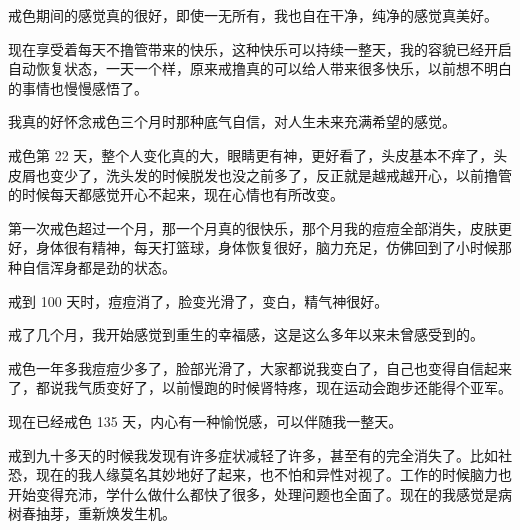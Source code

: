 \begin{case}
    戒色期间的感觉真的很好，即使一无所有，我也自在干净，纯净的感觉真美好。
\end{case}

\begin{case}
    现在享受着每天不撸管带来的快乐，这种快乐可以持续一整天，我的容貌已经开启自动恢复状态，一天一个样，原来戒撸真的可以给人带来很多快乐，以前想不明白的事情也慢慢感悟了。
\end{case}

\begin{case}
    我真的好怀念戒色三个月时那种底气自信，对人生未来充满希望的感觉。
\end{case}

\begin{case}
    戒色第 22 天，整个人变化真的大，眼睛更有神，更好看了，头皮基本不痒了，头皮屑也变少了，洗头发的时候脱发也没之前多了，反正就是越戒越开心，以前撸管的时候每天都感觉开心不起来，现在心情也有所改变。
\end{case}

\begin{case}
    第一次戒色超过一个月，那一个月真的很快乐，那个月我的痘痘全部消失，皮肤更好，身体很有精神，每天打篮球，身体恢复很好，脑力充足，仿佛回到了小时候那种自信浑身都是劲的状态。
\end{case}

\begin{case}
    戒到 100 天时，痘痘消了，脸变光滑了，变白，精气神很好。
\end{case}

\begin{case}
    戒了几个月，我开始感觉到重生的幸福感，这是这么多年以来未曾感受到的。
\end{case}

\begin{case}
    戒色一年多我痘痘少多了，脸部光滑了，大家都说我变白了，自己也变得自信起来了，都说我气质变好了，以前慢跑的时候肾特疼，现在运动会跑步还能得个亚军。
\end{case}

\begin{case}
    现在已经戒色 135 天，内心有一种愉悦感，可以伴随我一整天。
\end{case}

\begin{case}
    戒到九十多天的时候我发现有许多症状减轻了许多，甚至有的完全消失了。比如社恐，现在的我人缘莫名其妙地好了起来，也不怕和异性对视了。工作的时候脑力也开始变得充沛，学什么做什么都快了很多，处理问题也全面了。现在的我感觉是病树春抽芽，重新焕发生机。
\end{case}

